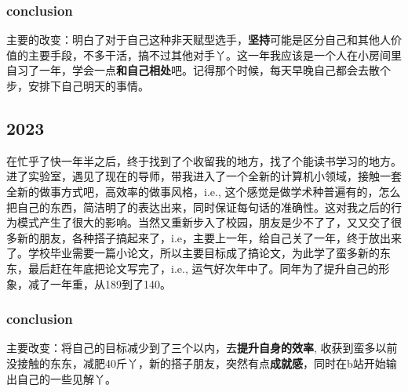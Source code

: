 \documentclass{article}
\begin{document}
\subsubsection*{conclusion}
主要的改变：明白了对于自己这种非天赋型选手，\textbf{坚持}可能是区分自己和其他人价值的主要手段，不多干活，搞不过其他对手丫。这一年我应该是一个人在小房间里自习了一年，学会一点\textbf{和自己相处}吧。记得那个时候，每天早晚自己都会去散个步，安排下自己明天的事情。

\subsection{2023}
在忙乎了快一年半之后，终于找到了个收留我的地方，找了个能读书学习的地方。进了实验室，遇见了现在的导师，带我进入了一个全新的计算机小领域，接触一套全新的做事方式吧，高效率的做事风格，i.e., 这个感觉是做学术种普遍有的，怎么把自己的东西，简洁明了的表达出来，同时保证每句话的准确性。这对我之后的行为模式产生了很大的影响。当然又重新步入了校园，朋友是少不了了，又又交了很多新的朋友，各种搭子搞起来了，i.e，主要上一年，给自己关了一年，终于放出来了。学校毕业需要一篇小论文，所以主要目标成了搞论文，为此学了蛮多新的东东，最后赶在年底把论文写完了，i.e., 运气好次年中了。同年为了提升自己的形象，减了一年重，从189到了140。
\subsubsection*{conclusion}
主要改变：将自己的目标减少到了三个以内，去\textbf{提升自身的效率}, 收获到蛮多以前没接触的东东，减肥40斤丫，新的搭子朋友，突然有点\textbf{成就感}，同时在b站开始输出自己的一些见解丫。
\end{document}
